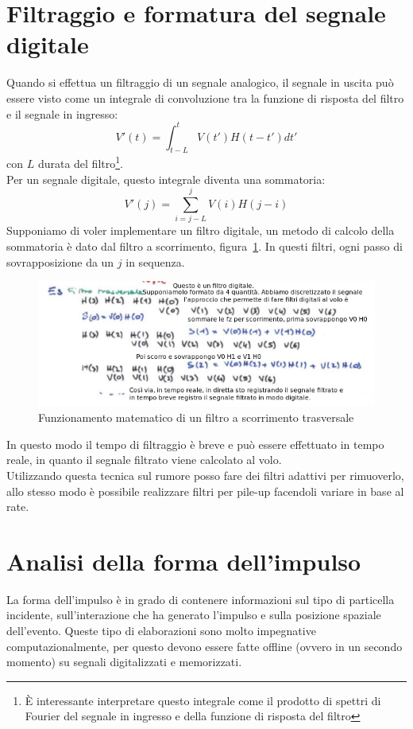 \section{Filtraggio e formatura del segnale digitale}
Quando si effettua un filtraggio di un segnale analogico, il segnale in uscita pu\`o essere visto come un integrale di convoluzione
tra la funzione di risposta del filtro e il segnale in ingresso:
\begin{equation*}
V'(t) = \int_{t-L}^t V(t') H(t-t') dt'
\end{equation*}
con $L$ durata del filtro\footnote{\`E interessante interpretare questo integrale come il prodotto di spettri di Fourier del segnale in ingresso e della funzione di risposta del filtro}.\\
Per un segnale digitale, questo integrale diventa una sommatoria:
\begin{equation*}
V'(j) = \sum_{i=j-L}^j V(i)H(j-i)
\end{equation*}
Supponiamo di voler implementare un filtro digitale, un metodo di calcolo della sommatoria \`e dato dal filtro a scorrimento, figura~\ref{fig:filtroScorrimento}.
In questi filtri, ogni passo di sovrapposizione da un $j$ in sequenza.
\begin{figure}[htbp]
\begin{center}
\includegraphics[scale=0.80]{./Immagini/FiltroScorrimento.png}
\caption{Funzionamento matematico di un filtro a scorrimento trasversale}
\label{fig:filtroScorrimento}
\end{center}
\end{figure}
In questo modo il tempo di filtraggio \`e breve e pu\`o essere effettuato in tempo reale, in quanto il segnale filtrato viene calcolato al volo.\\
Utilizzando questa tecnica sul rumore posso fare dei filtri adattivi per rimuoverlo, allo stesso modo \`e possibile realizzare filtri per pile-up facendoli variare
in base al rate.
\section{Analisi della forma dell'impulso}
La forma dell'impulso \`e in grado di contenere informazioni sul tipo di particella incidente, sull'interazione che ha generato l'impulso e sulla posizione spaziale dell'evento.
Queste tipo di elaborazioni sono molto impegnative computazionalmente, per questo devono essere fatte offline (ovvero in un secondo momento) su segnali digitalizzati e memorizzati.
